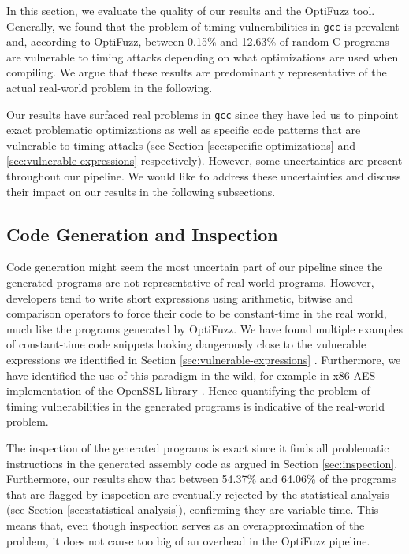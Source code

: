 \label{sec:evaluation}
In this section, we evaluate the quality of our results and the OptiFuzz tool.
Generally, we found that the problem of timing vulnerabilities in \texttt{gcc} is prevalent and, according to OptiFuzz, between 0.15\% and 12.63\% of random C programs are vulnerable to timing attacks depending on what optimizations are used when compiling. 
We argue that these results are predominantly representative of the actual real-world problem in the following.

Our results have surfaced real problems in \texttt{gcc} since they have led us to pinpoint exact problematic optimizations as well as specific code patterns that are vulnerable to timing attacks (see Section \ref{sec:specific-optimizations} and \ref{sec:vulnerable-expressions} respectively).
However, some uncertainties are present throughout our pipeline.
We would like to address these uncertainties and discuss their impact on our results in the following subsections.

\subsection{Code Generation and Inspection}
Code generation might seem the most uncertain part of our pipeline since the generated programs are not representative of real-world programs.
However, developers tend to write short expressions using arithmetic, bitwise and comparison operators to force their code to be constant-time in the real world, much like the programs generated by OptiFuzz. 
We have found multiple examples of constant-time code snippets looking dangerously close to the vulnerable expressions we identified in Section \ref{sec:vulnerable-expressions} \citep{fact,what-you-c,verifying-constant-time-llvm}.
Furthermore, we have identified the use of this paradigm in the wild, for example in x86 AES implementation of the OpenSSL library \citep{openssl}.
Hence quantifying the problem of timing vulnerabilities in the generated programs is indicative of the real-world problem.

The inspection of the generated programs is exact since it finds all problematic instructions in the generated assembly code as argued in Section \ref{sec:inspection}.
Furthermore, our results show that between 54.37\% and 64.06\% of the programs that are flagged by inspection are eventually rejected by the statistical analysis (see Section \ref{sec:statistical-analysis}), confirming they are variable-time. 
This means that, even though inspection serves as an overapproximation of the problem, it does not cause too big of an overhead in the OptiFuzz pipeline.

